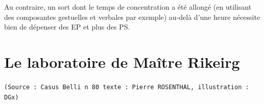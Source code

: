 \documentclass[11pt,twoside,a4paper]{article}
\begin{document}
\begin{multicols*}{3}
{{\begin{minipage}[ht]{0.30\textwidth}
Au contraire, un sort dont le temps de concentration a {\'e}t{\'e} allong{\'e} (en utilisant des composantes gestuelles et verbales par exemple) au-del{\`a} d'une heure n{\'e}cessite bien de d{\'e}penser des EP et plus des PS.~\\
\end{minipage} } %

} %
\end{multicols*} 

\clearpage

\section{Le laboratoire de Ma{\^i}tre Rikeirg}

\texttt{\scriptsize{(Source : Casus Belli n 80 texte : Pierre ROSENTHAL, illustration : DGx)}}
\end{document}
